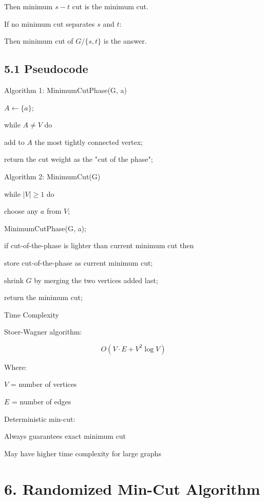 \documentclass[12pt]{article}
\begin{document}
Then minimum \( s - t \) cut is the minimum cut.

If no minimum cut separates \( s \) and \( t \):

Then minimum cut of \( G/\{s,t\} \) is the answer.

\subsection*{5.1 Pseudocode}

Algorithm 1: MinimumCutPhase(G, a)

\( A \leftarrow \{a\}; \)

while \( A \neq V \) do

\hspace*{1cm} add to \( A \) the most tightly connected vertex;

return the cut weight as the "cut of the phase";

Algorithm 2: MinimumCut(G)

while \( |V| \geq 1 \) do

\hspace*{1cm} choose any \( a \) from \( V \);

\hspace*{1cm} MinimumCutPhase(G, a);

\hspace*{1cm} if cut-of-the-phase is lighter than current minimum cut then

\hspace*{2cm} store cut-of-the-phase as current minimum cut;

\hspace*{1cm} shrink \( G \) by merging the two vertices added last;

return the minimum cut;

Time Complexity

Stoer-Wagner algorithm:

\[
O(V \cdot E + V^2 \log V)
\]

Where:

\( V \) = number of vertices

\( E \) = number of edges

Deterministic min-cut:

Always guarantees exact minimum cut

May have higher time complexity for large graphs

\section*{6. Randomized Min-Cut Algorithm}
\end{document}
